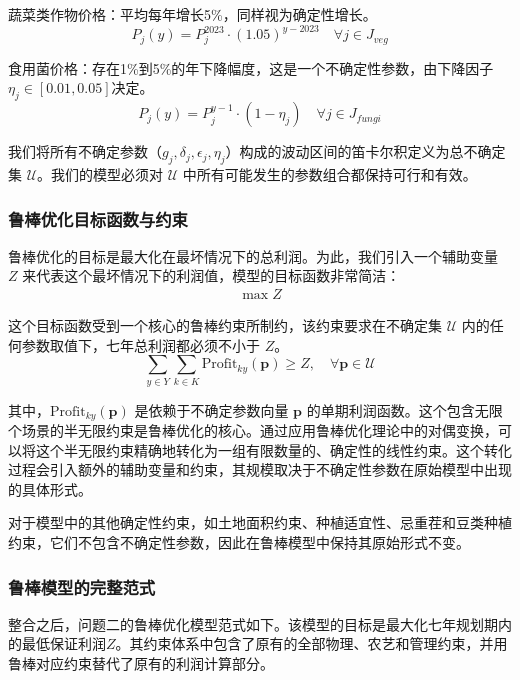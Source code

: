 \documentclass[withoutpreface,bwprint]{cumcmthesis} %
\begin{document}
蔬菜类作物价格：平均每年增长5\%，同样视为确定性增长。
\begin{equation}
	P_j(y) = P_j^{2023} \cdot (1.05)^{y-2023} \quad \forall j \in J_{veg}
\end{equation}

食用菌价格：存在1\%到5\%的年下降幅度，这是一个不确定性参数，由下降因子$\eta_j \in [0.01, 0.05]$决定。
\begin{equation}
	P_j(y) = P_j^{y-1} \cdot (1 - \eta_j) \quad \forall j \in J_{fungi}
\end{equation}


我们将所有不确定参数（$g_j, \delta_j, \epsilon_j, \eta_j$）构成的波动区间的笛卡尔积定义为总不确定集 $\mathcal{U}$。我们的模型必须对 $\mathcal{U}$ 中所有可能发生的参数组合都保持可行和有效。

\subsubsection{鲁棒优化目标函数与约束}

鲁棒优化的目标是最大化在最坏情况下的总利润。为此，我们引入一个辅助变量 $Z$ 来代表这个最坏情况下的利润值，模型的目标函数非常简洁：
\begin{align}
	\max Z
\end{align}

这个目标函数受到一个核心的鲁棒约束所制约，该约束要求在不确定集 $\mathcal{U}$ 内的任何参数取值下，七年总利润都必须不小于 $Z$。
\begin{equation}
	\sum_{y \in Y} \sum_{k \in K} \text{Profit}_{ky}(\mathbf{p}) \ge Z, \quad \forall \mathbf{p} \in \mathcal{U}
\end{equation}

其中，$\text{Profit}_{ky}(\mathbf{p})$ 是依赖于不确定参数向量 $\mathbf{p}$ 的单期利润函数。这个包含无限个场景的半无限约束是鲁棒优化的核心。通过应用鲁棒优化理论中的对偶变换，可以将这个半无限约束精确地转化为一组有限数量的、确定性的线性约束。这个转化过程会引入额外的辅助变量和约束，其规模取决于不确定性参数在原始模型中出现的具体形式。

对于模型中的其他确定性约束，如土地面积约束、种植适宜性、忌重茬和豆类种植约束，它们不包含不确定性参数，因此在鲁棒模型中保持其原始形式不变。

\subsubsection{鲁棒模型的完整范式}

整合之后，问题二的鲁棒优化模型范式如下。该模型的目标是最大化七年规划期内的最低保证利润$Z$。其约束体系中包含了原有的全部物理、农艺和管理约束，并用鲁棒对应约束替代了原有的利润计算部分。
\end{document}
